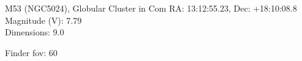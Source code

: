 \begin{block}{M53 (NGC5024), Globular Cluster in Com}
    RA: 13:12:55.23, Dec: +18:10:08.8 \\ 
    Magnitude (V): 7.79 \\ 
    Dimensions: 9.0 

    Finder fov: 60 
\end{block}